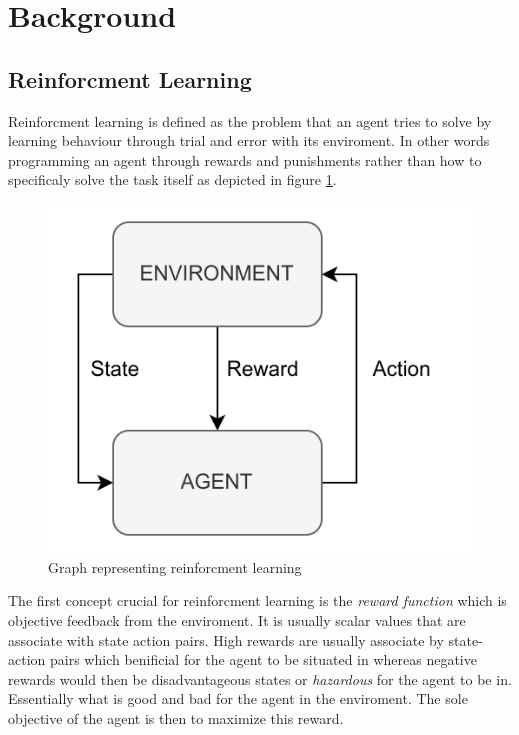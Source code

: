 \section{Background}

\subsection{Reinforcment Learning}

Reinforcment learning is defined as the problem that an agent tries to solve by learning behaviour through trial and error with its enviroment. In other words programming an agent through rewards and punishments rather than how to specificaly solve the task itself\cite{kaelbling1996reinforcement} as depicted in figure \ref{figRL}.
\begin{figure}[H]
    \centering
    \includegraphics [scale = 0.2]{Images/RL_graph.png}
    \caption{Graph representing reinforcment learning}
    \label{figRL}
\end{figure}
The first concept crucial for reinforcment learning is the \textit{reward function} which is objective feedback from the enviroment. It is usually scalar values that are associate with state action pairs. High rewards are usually associate by state-action pairs which benificial for the agent to be situated in whereas negative rewards would then be disadvantageous states or \textit{hazardous} for the agent to be in. Essentially what is good and bad for the agent in the enviroment. The sole objective of the agent is then to maximize this reward\cite{sutton1999reinforcement}.

